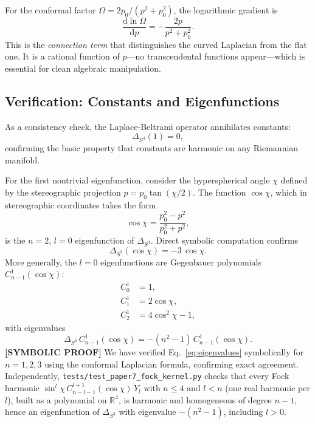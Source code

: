 \documentclass[aps,pra,twocolumn,superscriptaddress,longbibliography]{revtex4-2}
\begin{document}
For the conformal factor $\Omega = 2p_0/(p^2 + p_0^2)$, the logarithmic gradient is
\begin{equation}
\frac{\mathrm{d} \ln\Omega}{\mathrm{d}p} = -\frac{2p}{p^2 + p_0^2}.
\label{eq:connection}
\end{equation}
This is the \textit{connection term} that distinguishes the curved Laplacian from the flat one. It is a rational function of $p$---no transcendental functions appear---which is essential for clean algebraic manipulation.

\subsection{Verification: Constants and Eigenfunctions}

As a consistency check, the Laplace-Beltrami operator annihilates constants:
\begin{equation}
\Delta_{S^3}(1) = 0,
\end{equation}
confirming the basic property that constants are harmonic on any Riemannian manifold.

For the first nontrivial eigenfunction, consider the hyperspherical angle $\chi$ defined by the stereographic projection $p = p_0 \tan(\chi/2)$. The function $\cos\chi$, which in stereographic coordinates takes the form
\begin{equation}
\cos\chi = \frac{p_0^2 - p^2}{p_0^2 + p^2},
\label{eq:cos_chi}
\end{equation}
is the $n = 2$, $l = 0$ eigenfunction of $\Delta_{S^3}$. Direct symbolic computation confirms
\begin{equation}
\Delta_{S^3}(\cos\chi) = -3\,\cos\chi.
\label{eq:eigenvalue_n2}
\end{equation}
More generally, the $l = 0$ eigenfunctions are Gegenbauer polynomials $C^1_{n-1}(\cos\chi)$:
\begin{align}
C^1_0 &= 1, \\
C^1_1 &= 2\cos\chi, \\
C^1_2 &= 4\cos^2\chi - 1,
\end{align}
with eigenvalues
\begin{equation}
\Delta_{S^3}\, C^1_{n-1}(\cos\chi) = -(n^2 - 1)\, C^1_{n-1}(\cos\chi).
\label{eq:eigenvalues}
\end{equation}
\textbf{[SYMBOLIC PROOF]} We have verified Eq.~\eqref{eq:eigenvalues} symbolically for $n = 1, 2, 3$ using the conformal Laplacian formula, confirming exact agreement. Independently, \texttt{tests/test\_paper7\_fock\_kernel.py} checks that every Fock harmonic $\sin^l\!\chi\, C^{l+1}_{n-l-1}(\cos\chi)\,Y_l$ with $n \le 4$ and $l < n$ (one real harmonic per $l$), built as a polynomial on $\mathbb{R}^4$, is harmonic and homogeneous of degree $n-1$, hence an eigenfunction of $\Delta_{S^3}$ with eigenvalue $-(n^2-1)$, including $l > 0$.
\end{document}
